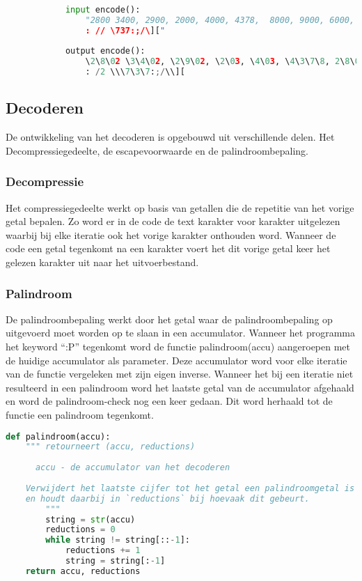 \documentclass{article}
\begin{document}
       
       \begin{lstlisting}[frame=single, language=python]  % Start your code-block
            
            input encode():
                "2800 3400, 2900, 2000, 4000, 4378,  8000, 9000, 6000, 5689, 3478, 4085, 7095, 1010,1785, 3000,8090
                : // \737:;/\]["
    
            output encode():
                \2\8\02 \3\4\02, \2\9\02, \2\03, \4\03, \4\3\7\8, 2\8\03, \9\03, \6\03, \5\6\8\9, \3\4\7\8, \4\0\8\5, \7\0\9\5, \1\0\1\0,\1\7\8\5, \3\03,\8\0\9\0
                : /2 \\\7\3\7:;/\\][
        \end{lstlisting}
       
    \subsection{Decoderen}
    De ontwikkeling van het decoderen is opgebouwd uit verschillende delen. Het Decompressiegedeelte, de escapevoorwaarde en de palindroombepaling. 
    
     \subsubsection{Decompressie}
    Het compressiegedeelte werkt op basis van getallen die de repetitie van
		het vorige getal bepalen. Zo word er in de code de text karakter voor
		karakter uitgelezen waarbij bij elke iteratie ook het vorige karakter
		onthouden word. Wanneer de code een getal tegenkomt na een karakter voert
		het dit vorige getal keer het gelezen karakter uit naar het uitvoerbestand. 
    
    \subsubsection{Palindroom}
    De palindroombepaling werkt door het getal waar de palindroombepaling op
		uitgevoerd moet worden op te slaan in een accumulator.
		Wanneer het programma het keyword ``:P'' tegenkomt word de functie
		palindroom(accu) aangeroepen met de huidige accumulator als parameter.
		Deze accumulator word voor elke iteratie van de functie vergeleken met
		zijn eigen inverse. Wanneer het bij een iteratie niet resulteerd in een
		palindroom word het laatste getal van de accumulator afgehaald en word
		de palindroom-check nog een keer gedaan. Dit word herhaald tot de functie
		een palindroom tegenkomt.
    \begin{lstlisting}[frame=single, language=python]
    def palindroom(accu):
    """ retourneert (accu, reductions)
    
      accu - de accumulator van het decoderen
    
    Verwijdert het laatste cijfer tot het getal een palindroomgetal is
    en houdt daarbij in `reductions` bij hoevaak dit gebeurt.
        """
        string = str(accu)
        reductions = 0
        while string != string[::-1]:
            reductions += 1
            string = string[:-1]
    return accu, reductions
    
    \end{lstlisting}
        
\end{document}
